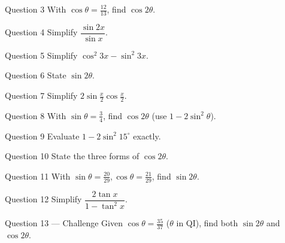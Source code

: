 \documentclass[11pt]{article}
\begin{document}
\begin{qbox}{Question 3}
With $\cos\theta=\tfrac{12}{13}$, find $\cos2\theta$.\workspace{2.4cm}
\end{qbox}

\begin{qbox}{Question 4}
Simplify $\dfrac{\sin2x}{\sin x}$.\workspace{2.4cm}
\end{qbox}

\begin{qbox}{Question 5}
Simplify $\cos^2 3x-\sin^2 3x$.\workspace{2.4cm}
\end{qbox}

\begin{qbox}{Question 6}
State $\sin2\theta$.\workspace{2.4cm}
\end{qbox}

\begin{qbox}{Question 7}
Simplify $2\sin\tfrac{x}{2}\cos\tfrac{x}{2}$.\workspace{2.4cm}
\end{qbox}

\begin{qbox}{Question 8}
With $\sin\theta=\tfrac34$, find $\cos2\theta$ (use $1-2\sin^2\theta$).\workspace{2.4cm}
\end{qbox}

\begin{qbox}{Question 9}
Evaluate $1-2\sin^2 15^\circ$ exactly.\workspace{2.4cm}
\end{qbox}

\begin{qbox}{Question 10}
State the three forms of $\cos2\theta$.\workspace{2.4cm}
\end{qbox}

\begin{qbox}{Question 11}
With $\sin\theta=\tfrac{20}{29},\cos\theta=\tfrac{21}{29}$, find $\sin2\theta$.\workspace{2.4cm}
\end{qbox}

\begin{qbox}{Question 12}
Simplify $\dfrac{2\tan x}{1-\tan^2 x}$.\workspace{2.4cm}
\end{qbox}

\begin{qbox}{Question 13 --- Challenge}
Given $\cos\theta=\tfrac{35}{37}$ ($\theta$ in QI), find both $\sin2\theta$ and $\cos2\theta$.\workspace{3cm}
\end{qbox}

\clearpage
{}
\end{document}
